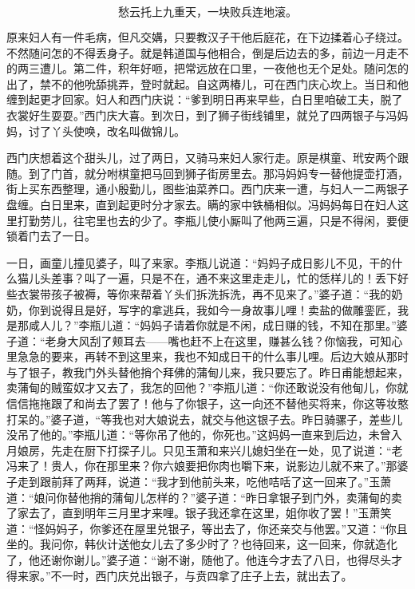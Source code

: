 \[
愁云托上九重天，一块败兵连地滚。
\]

原来妇人有一件毛病，但凡交媾，只要教汉子干他后庭花，在下边揉着心子绕过。不然随问怎的不得丢身子。就是韩道国与他相合，倒是后边去的多，前边一月走不的两三遭儿。第二件，积年好咂，把常远放在口里，一夜他也无个足处。随问怎的出了，禁不的他吮舔挑弄，登时就起。自这两椿儿，可在西门庆心坎上。当日和他缠到起更才回家。妇人和西门庆说：“爹到明日再来早些，白日里咱破工夫，脱了衣裳好生耍耍。”西门庆大喜。到次日，到了狮子街线铺里，就兑了四两银子与冯妈妈，讨了丫头使唤，改名叫做锦儿。

西门庆想着这个甜头儿，过了两日，又骑马来妇人家行走。原是棋童、玳安两个跟随。到了门首，就分咐棋童把马回到狮子街房里去。那冯妈妈专一替他提壶打酒，街上买东西整理，通小殷勤儿，图些油菜养口。西门庆来一遭，与妇人一二两银子盘缠。白日里来，直到起更时分才家去。瞒的家中铁桶相似。冯妈妈每日在妇人这里打勤劳儿，往宅里也去的少了。李瓶儿使小厮叫了他两三遍，只是不得闲，要便锁着门去了一日。

一日，画童儿撞见婆子，叫了来家。李瓶儿说道：“妈妈子成日影儿不见，干的什么猫儿头差事？叫了一遍，只是不在，通不来这里走走儿，忙的恁样儿的！丢下好些衣裳带孩子被褥，等你来帮着丫头们拆洗拆洗，再不见来了。”婆子道：“我的奶奶，你到说得且是好，写字的拿逃兵，我如今一身故事儿哩！卖盐的做雕銮匠，我是那咸人儿？”李瓶儿道：“妈妈子请着你就是不闲，成日赚的钱，不知在那里。”婆子道：“老身大风刮了颊耳去——嘴也赶不上在这里，赚甚么钱？你恼我，可知心里急急的要来，再转不到这里来，我也不知成日干的什么事儿哩。后边大娘从那时与了银子，教我门外头替他捎个拜佛的蒲甸儿来，我只要忘了。昨日甫能想起来，卖蒲甸的贼蛮奴才又去了，我怎的回他？”李瓶儿道：“你还敢说没有他甸儿，你就信信拖拖跟了和尚去了罢了！他与了你银子，这一向还不替他买将来，你这等妆憨打呆的。”婆子道，“等我也对大娘说去，就交与他这银子去。昨日骑骡子，差些儿没吊了他的。”李瓶儿道：“等你吊了他的，你死也。”这妈妈一直来到后边，未曾入月娘房，先走在厨下打探子儿。只见玉萧和来兴儿媳妇坐在一处，见了说道：“老冯来了！贵人，你在那里来？你六娘要把你肉也嚼下来，说影边儿就不来了。”那婆子走到跟前拜了两拜，说道：“我才到他前头来，吃他咭咶了这一回来了。”玉萧道：“娘问你替他捎的蒲甸儿怎样的？”婆子道：“昨日拿银子到门外，卖蒲甸的卖了家去了，直到明年三月里才来哩。银子我还拿在这里，姐你收了罢！”玉萧笑道：“怪妈妈子，你爹还在屋里兑银子，等出去了，你还亲交与他罢。”又道：“你且坐的。我问你，韩伙计送他女儿去了多少时了？也待回来，这一回来，你就造化了，他还谢你谢儿。”婆子道：“谢不谢，随他了。他连今才去了八日，也得尽头才得来家。”不一时，西门庆兑出银子，与贲四拿了庄子上去，就出去了。

